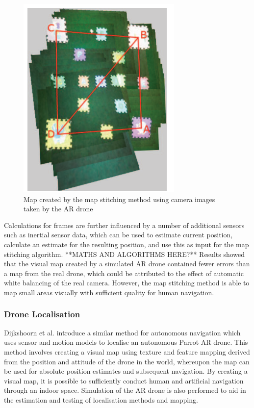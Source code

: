 \begin{figure}
\centering	
\includegraphics[scale=0.2]{img/mapstitch}	
\caption{Map created by the map stitching method using camera images taken by the AR drone }
\end{figure}

Calculations for frames are further influenced by a number of additional sensors such as inertial sensor data, which can be used to estimate current position, calculate an estimate for the resulting position, and use this as input for the map stitching algorithm. 
**MATHS AND ALGORITHMS HERE?**
Results showed that the visual map created by a simulated AR drone contained fewer errors than a map from the real drone, which could be attributed to the effect of automatic white balancing of the real camera. However, the map stitching method is able to map small areas visually with sufficient quality for human navigation.

\subsubsection{Drone Localisation}
Dijkshoorn et al. \cite{dijkshoorn2011} introduce a similar method for autonomous navigation which uses sensor and motion models to localise an autonomous Parrot AR drone. This method involves creating a visual map using texture and feature mapping derived from the position and attitude of the drone in the world, whereupon the map can be used for absolute position estimates and subsequent navigation. By creating a visual map, it is possible to sufficiently conduct human and artificial navigation through an indoor space. Simulation of the AR drone is also performed to aid in the estimation and testing of localisation methods and mapping.

